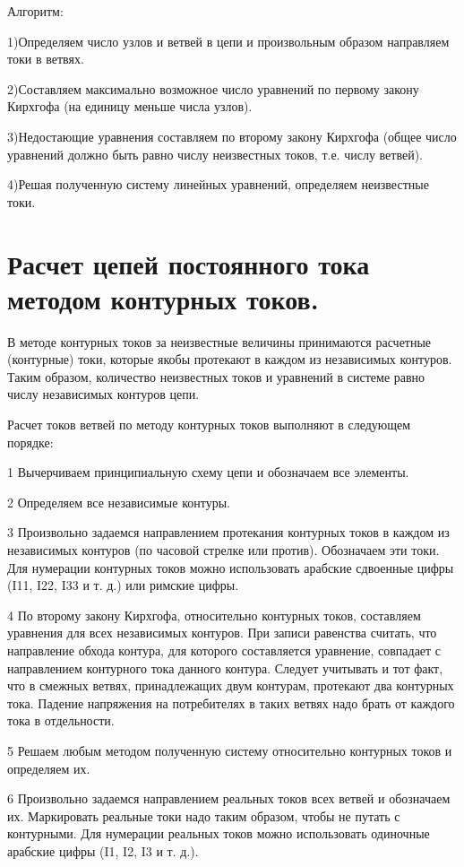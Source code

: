 \documentclass[a4paper, 12pt]{article}
\begin{document}
Алгоритм:

    1)Определяем число узлов и ветвей в цепи и произвольным образом направляем токи в ветвях.

    2)Составляем максимально возможное число уравнений по первому закону Кирхгофа (на единицу меньше числа узлов).
    
    3)Недостающие уравнения составляем  по  второму закону Кирхгофа (общее число уравнений должно быть равно числу неизвестных токов, т.е. числу ветвей).

    4)Решая полученную  систему  линейных  уравнений, определяем неизвестные токи.

\section{Расчет цепей постоянного тока методом контурных токов.}
В методе контурных токов за неизвестные величины принимаются расчетные (контурные) токи, которые якобы протекают в каждом из независимых контуров. Таким образом, количество неизвестных токов и уравнений в системе равно числу независимых контуров цепи.

Расчет токов ветвей по методу контурных токов выполняют в следующем порядке:

1 Вычерчиваем принципиальную схему цепи и обозначаем все элементы.

2 Определяем все независимые контуры.

3 Произвольно задаемся направлением протекания контурных токов в каждом из независимых контуров (по часовой стрелке или против). Обозначаем эти токи. Для нумерации контурных токов можно использовать арабские сдвоенные цифры (I11, I22, I33 и т. д.) или римские цифры.

4 По второму закону Кирхгофа, относительно контурных токов, составляем уравнения для всех независимых контуров. При записи равенства считать, что направление обхода контура, для которого составляется уравнение, совпадает с направлением контурного тока данного контура. Следует учитывать и тот факт, что в смежных ветвях, принадлежащих двум контурам, протекают два контурных тока. Падение напряжения на потребителях в таких ветвях надо брать от каждого тока в отдельности.

5 Решаем любым методом полученную систему относительно контурных токов и определяем их.

6 Произвольно задаемся направлением реальных токов всех ветвей и обозначаем их. Маркировать реальные токи надо таким образом, чтобы не путать с контурными. Для нумерации реальных токов можно использовать одиночные арабские цифры (I1, I2, I3 и т. д.).
\end{document}
